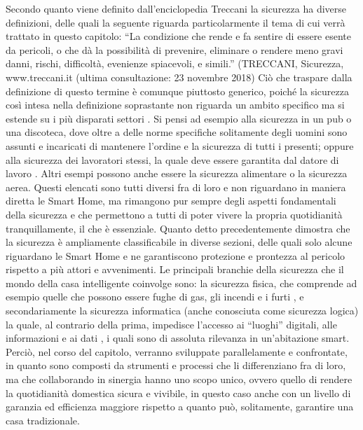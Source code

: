 Secondo quanto viene definito dall’enciclopedia Treccani la sicurezza ha diverse definizioni, delle quali la seguente riguarda particolarmente il tema di cui verrà trattato in questo capitolo:
“La condizione che rende e fa sentire di essere esente da pericoli, o che dà la possibilità di prevenire, eliminare o rendere meno gravi danni, rischi, difficoltà, evenienze spiacevoli, e simili.” (TRECCANI, Sicurezza, www.treccani.it (ultima consultazione: 23 novembre 2018) 
Ciò che traspare dalla definizione di questo termine è comunque piuttosto generico, poiché la sicurezza così intesa nella definizione soprastante non riguarda un ambito specifico ma si estende su i più disparati settori . Si pensi ad esempio alla sicurezza in un pub o una discoteca, dove oltre a delle norme specifiche solitamente degli uomini sono assunti e incaricati di mantenere l’ordine e la sicurezza di tutti i presenti; oppure alla sicurezza dei lavoratori stessi, la quale deve essere garantita dal datore di lavoro . Altri esempi possono anche essere la sicurezza alimentare o la sicurezza aerea. Questi elencati sono tutti diversi fra di loro e non riguardano in maniera diretta le Smart Home, ma rimangono pur sempre degli aspetti fondamentali della sicurezza e che permettono a tutti di poter vivere la propria quotidianità tranquillamente, il che è essenziale.
Quanto detto precedentemente dimostra che la sicurezza è ampliamente classificabile in diverse sezioni, delle quali solo alcune riguardano le Smart Home e ne garantiscono protezione e prontezza al pericolo rispetto a più attori e avvenimenti. Le principali branchie della sicurezza che il mondo della casa intelligente coinvolge sono: la sicurezza fisica, che comprende ad esempio quelle che possono essere fughe di gas, gli incendi e i furti , e secondariamente la sicurezza informatica (anche conosciuta come sicurezza logica) la quale, al contrario della prima, impedisce l’accesso ai “luoghi” digitali, alle informazioni e ai dati , i quali sono di assoluta rilevanza in un’abitazione smart. Perciò, nel corso del capitolo, verranno sviluppate parallelamente e confrontate, in quanto sono composti da strumenti e processi che li differenziano fra di loro, ma che collaborando in sinergia hanno uno scopo unico, ovvero quello di rendere la quotidianità domestica sicura e vivibile, in questo caso anche con un livello di garanzia ed efficienza maggiore rispetto a quanto può, solitamente, garantire una casa tradizionale. 
